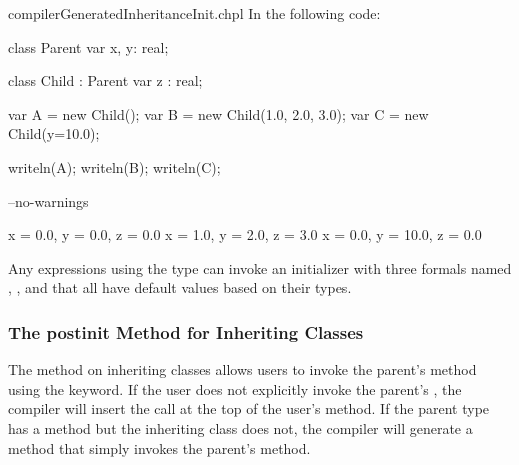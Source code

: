 \begin{chapelexample}{compilerGeneratedInheritanceInit.chpl}
In the following code:
\begin{chapel}
class Parent {
  var x, y: real;
}

class Child : Parent {
  var z : real;
}

var A = new Child();
var B = new Child(1.0, 2.0, 3.0);
var C = new Child(y=10.0);
\end{chapel}
\begin{chapelpost}
writeln(A);
writeln(B);
writeln(C);
\end{chapelpost}
\begin{chapelcompopts}
--no-warnings
\end{chapelcompopts}
\begin{chapeloutput}
{x = 0.0, y = 0.0, z = 0.0}
{x = 1.0, y = 2.0, z = 3.0}
{x = 0.0, y = 10.0, z = 0.0}
\end{chapeloutput}
Any  expressions using the  type can invoke an
initializer with three formals named , , and  that all
have default values based on their types.
\end{chapelexample}

\subsubsection{The postinit Method for Inheriting Classes}
\label{The_postinit_Method_for_Inheriting_Classes}

The  method on inheriting classes allows users to invoke
the parent's  method using the  keyword. If the
user does not explicitly invoke the parent's , the compiler
will insert the call at the top of the user's  method. If the
parent type has a  method but the inheriting class does not,
the compiler will generate a  method that simply invokes the
parent's  method.

